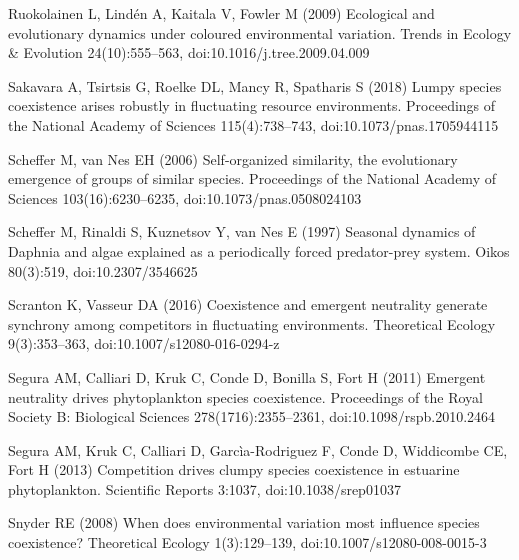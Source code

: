 \documentclass[a4paper,12pt]{article}
\begin{document}
\begin{thebibliography}{68}
Ruokolainen L, Lind\'{e}n A, Kaitala V, Fowler M (2009) Ecological and
  evolutionary dynamics under coloured environmental variation. Trends in
  Ecology \& Evolution 24(10):555--563, doi:{10.1016/j.tree.2009.04.009}

Sakavara A, Tsirtsis G, Roelke DL, Mancy R, Spatharis S (2018) Lumpy species
  coexistence arises robustly in fluctuating resource environments. Proceedings
  of the National Academy of Sciences 115(4):738--743,
  doi:{10.1073/pnas.1705944115}

Scheffer M, van Nes EH (2006) Self-organized similarity, the evolutionary
  emergence of groups of similar species. Proceedings of the National Academy
  of Sciences 103(16):6230--6235, doi:{10.1073/pnas.0508024103}

Scheffer M, Rinaldi S, Kuznetsov Y, van Nes E (1997) Seasonal dynamics of
  {Daphnia} and algae explained as a periodically forced predator-prey system.
  Oikos 80(3):519, doi:{10.2307/3546625}

Scranton K, Vasseur DA (2016) Coexistence and emergent neutrality generate
  synchrony among competitors in fluctuating environments. Theoretical Ecology
  9(3):353--363, doi:{10.1007/s12080-016-0294-z}

Segura AM, Calliari D, Kruk C, Conde D, Bonilla S, Fort H (2011) Emergent
  neutrality drives phytoplankton species coexistence. Proceedings of the Royal
  Society B: Biological Sciences 278(1716):2355--2361,
  doi:{10.1098/rspb.2010.2464}

Segura AM, Kruk C, Calliari D, Garc\`{i}a-Rodriguez F, Conde D, Widdicombe CE,
  Fort H (2013) Competition drives clumpy species coexistence in estuarine
  phytoplankton. Scientific Reports 3:1037, doi:{10.1038/srep01037}

Snyder RE (2008) When does environmental variation most influence species
  coexistence? Theoretical Ecology 1(3):129--139,
  doi:{10.1007/s12080-008-0015-3}


\end{thebibliography}
\end{document}
